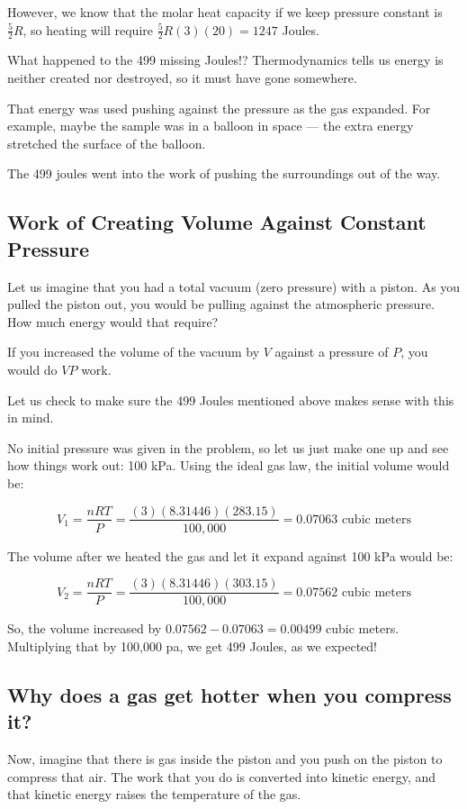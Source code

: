However, we know that the molar heat capacity if we keep pressure constant is $\frac{5}{2}R$, so heating will require $\frac{5}{2}R(3)(20) = 1247$ Joules. 

What happened to the 499 missing Joules!? Thermodynamics tells us energy is neither created nor destroyed, so it must have gone somewhere.

That energy was used pushing against the pressure as the gas expanded. For example, maybe the sample was in a balloon in space --- the extra energy stretched the surface of the balloon. 

The 499 joules went into the work of pushing the surroundings out of the way.  

\subsection{Work of Creating Volume Against Constant Pressure}

Let us imagine that you had a total vacuum (zero pressure) with a piston. As you pulled the piston out, you would be pulling against the atmospheric pressure. How much energy would that require?

If you increased the volume of the vacuum by $V$ against a pressure of $P$, you would do $VP$ work.

Let us check to make sure the 499 Joules mentioned above makes sense with this in mind.

No initial pressure was given in the problem, so let us just make one up and see how things work out: 100 kPa. Using the ideal gas law, the initial volume would be:

$$V_1 = \frac{n R T}{P} = \frac{(3)(8.31446)(283.15)}{100,000} = 0.07063\text{ cubic meters}$$

The volume after we heated the gas and let it expand against 100 kPa would be:

$$V_2 = \frac{n R T}{P} = \frac{(3)(8.31446)(303.15)}{100,000} = 0.07562\text{ cubic meters}$$

So, the volume increased by $0.07562 - 0.07063 = 0.00499$ cubic meters.  
Multiplying that by 100,000 pa, we get 499 Joules, as we expected!

\subsection{Why does a gas get hotter when you compress it?}

Now, imagine that there is gas inside the piston and you push on the piston to compress that air.  The work that you do is converted into kinetic energy, and that kinetic energy raises the temperature of the gas.

